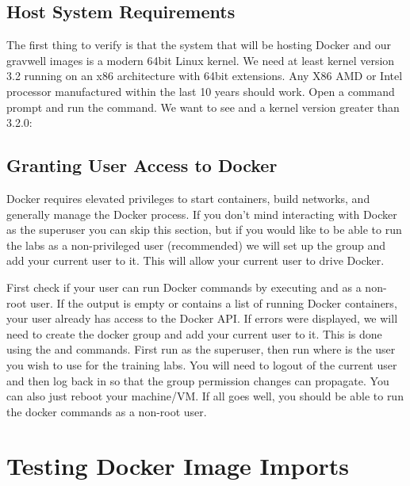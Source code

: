 \subsection{Host System Requirements}

The first thing to verify is that the system that will be hosting
Docker and our gravwell images is a modern 64bit Linux kernel. We need
at least kernel version 3.2 running on an x86 architecture with 64bit
extensions. Any X86 AMD or Intel processor manufactured within the last
10 years should work. Open a command prompt and run the  command. We want to see  and a kernel version greater
than 3.2.0:



\subsection{Granting User Access to Docker}

Docker requires elevated privileges to start containers, build
networks, and generally manage the Docker process. If you don't mind
interacting with Docker as the superuser you can skip this section, but
if you would like to be able to run the labs as a non-privileged user
(recommended) we will set up the  group and add your current
user to it. This will allow your current user to drive Docker.

First check if your user can run Docker commands by executing  and  as a non-root user. If the output is
empty or contains a list of running Docker containers, your user already
has access to the Docker API. If errors were displayed, we will need to
create the docker group and add your current user to it. This is done
using the  and  commands. First run  as the superuser, then run  where
 is the user you wish to use for
the training labs. You will need to logout of the current user and then
log back in so that the group permission changes can propagate. You can
also just reboot your machine/VM. If all goes well, you should be able
to run the docker commands as a non-root user.

\section{Testing Docker Image Imports}

